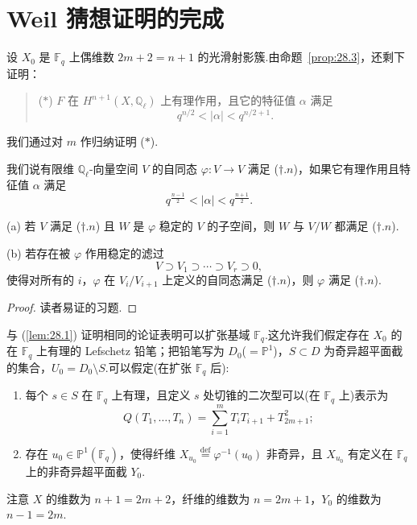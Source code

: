 ﻿%
\chapter{Weil 猜想证明的完成}\label{sec:33}

设 $X_0$ 是 $\mathbb{F}_q$ 上偶维数 $2m + 2 = n + 1$ 的光滑射影簇.由命题~\ref{prop:28.3}，还剩下证明：
\begin{quote}
($*$) $F$ 在 $H^{n+1}(X, \mathbb{Q}_{\ell})$ 上有理作用，且它的特征值 $\alpha$ 满足
\[
q^{n/2} < |\alpha| < q^{n/2+1}.
\]
\end{quote}
我们通过对 $m$ 作归纳证明 ($*$).

我们说有限维 $\mathbb{Q}_{\ell}$-向量空间 $V$ 的自同态 $\varphi \colon V \to V$ 满足 ($\dagger.n$)，如果它有理作用且特征值 $\alpha$ 满足
\[
q^{\frac{n-1}{2}} < |\alpha| < q^{\frac{n+1}{2}}.
\]

\begin{lemma}\label{lem:33.1}
(a) 若 $V$ 满足 ($\dagger.n$) 且 $W$ 是 $\varphi$ 稳定的 $V$ 的子空间，则 $W$ 与 $V/W$ 都满足 ($\dagger.n$).

(b) 若存在被 $\varphi$ 作用稳定的滤过
\[
V \supset V_1 \supset \cdots \supset V_r \supset 0,
\]
使得对所有的 $i$，$\varphi$ 在 $V_i/V_{i+1}$ 上定义的自同态满足 ($\dagger.n$)，则 $\varphi$ 满足 ($\dagger.n$).
\end{lemma}

\begin{proof}
读者易证的习题.
\end{proof}

与 (\ref{lem:28.1}) 证明相同的论证表明可以扩张基域 $\mathbb{F}_q$.这允许我们假定存在 $X_0$ 的在 $\mathbb{F}_q$ 上有理的 Lefschetz 铅笔；把铅笔写为 $D_0$($= \mathbb{P}^{1}$)，$S \subset D$ 为奇异超平面截的集合，$U_0 = D_0 \setminus S$.可以假定(在扩张 $\mathbb{F}_q$ 后):
\begin{enumerate}
  \item 每个 $s \in S$ 在 $\mathbb{F}_q$ 上有理，且定义 $s$ 处切锥的二次型可以(在 $\mathbb{F}_q$ 上)表示为
  \[
  Q(T_1, \ldots, T_n) = \sum_{i=1}^{m} T_i T_{i+1} + T^{2}_{2m+1};
  \]
  \item 存在 $u_0 \in \mathbb{P}^{1}(\mathbb{F}_q)$，使得纤维 $X_{u_0} \overset{\mathrm{def}}{=} \varphi^{-1}(u_0)$ 非奇异，且 $X_{u_0}$ 有定义在 $\mathbb{F}_q$ 上的非奇异超平面截 $Y_0$.
\end{enumerate}
注意 $X$ 的维数为 $n + 1 = 2m + 2$，纤维的维数为 $n = 2m + 1$，$Y_0$ 的维数为 $n - 1 = 2m$.

